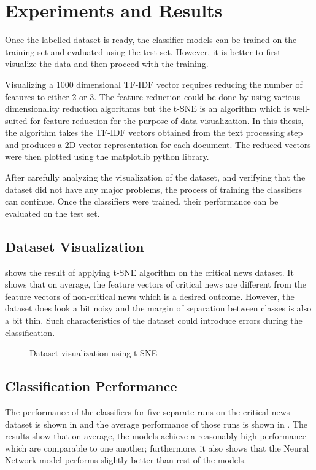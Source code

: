 \chapter{Experiments and Results} \label{result}
Once the labelled dataset is ready, the classifier models can be trained on the training set and evaluated using the test set. However, it is better to first visualize the data and then proceed with the training.

Visualizing a 1000 dimensional TF-IDF vector requires reducing the number of features to either 2 or 3. The feature reduction could be done by using various dimensionality reduction algorithms \cite{tenenbaum2000global, roweis2000nonlinear} but the t-SNE\cite{maaten2008visualizing} is an algorithm which is well-suited for feature reduction for the purpose of data visualization. In this thesis, the algorithm takes the TF-IDF vectors obtained from the text processing step and produces a 2D vector representation for each document. The reduced vectors were then plotted using the matplotlib\cite{hunter2007matplotlib} python library.

After carefully analyzing the visualization of the dataset, and verifying that the dataset did not have any major problems, the process of training the classifiers can continue. Once the classifiers were trained, their performance can be evaluated on the test set.

\section{Dataset Visualization}
 shows the result of applying t-SNE algorithm on the critical news dataset. It shows that on average, the feature vectors of critical news are different from the feature vectors of non-critical news which is a desired outcome. However, the dataset does look a bit noisy and the margin of separation between classes is also a bit thin. Such characteristics of the dataset could introduce errors during the classification.

\begin{figure}[h]
    \caption{Dataset visualization using t-SNE}
    \label{fig:dataset}
\end{figure}

\section{Classification Performance}
The performance of the classifiers for five separate runs on the critical news dataset is shown in  and the average performance of those runs is shown in . The results show that on average, the models achieve a reasonably high performance which are comparable to one another; furthermore, it also shows that the Neural Network model performs slightly better than rest of the models.

